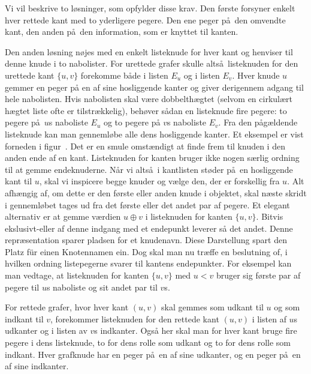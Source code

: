 Vi vil beskrive to løsninger, som opfylder disse krav.
Den første forsyner enkelt hver rettede kant med to yderligere pegere.
Den ene peger på den omvendte kant, den anden på den information, som er knyttet til kanten.

Den anden løsning nøjes med en enkelt listeknude for hver kant og henviser til denne knude i to nabolister.
For urettede grafer skulle altså listeknuden for den urettede kant $\{u,v\}$ forekomme både i listen $E_u$ og i listen $E_v$.
Hver knude $u$ gemmer en peger på en af sine hosliggende kanter og giver derigennem adgang til hele nabolisten.
Hvis nabolisten skal være dobbelthægtet (selvom en cirkulært hægtet liste ofte er tilstrækkelig), behøver sådan en listeknude fire pegere:
to pegere på $u$s naboliste $E_u$ og to pegere på $v$s naboliste $E_v$.
Fra den pågældende listeknude kan man gennemløbe alle dens hosliggende kanter.
Et eksempel er vist forneden i figur~.
Det er en smule omstændigt at finde frem til knuden i den anden ende af en kant.
Listeknuden for kanten bruger ikke nogen særlig ordning til at gemme endeknuderne.
Når vi altså i kantlisten støder på en hosliggende kant til $u$, skal vi inspicere begge knuder og vælge den, der er forskellig fra $u$.
Alt afhængig af, om dette er den første eller anden knude i objektet, skal næste skridt i gennemløbet tages ud fra det første eller det andet par af pegere.
Et elegant alternativ er at gemme værdien $u\oplus v$ i listeknuden for kanten $\{u,v\}$.
\cite{Naeher-Zlotowski}
Bitvis ekslusivt-eller af denne indgang med et endepunkt leverer så det andet.
Denne repræsentation sparer pladsen for et knudenavn.
Diese Darstellung spart den Platz für einen Knotennamen ein. 
Dog skal man nu træffe en beslutning of, i hvilken ordning listepegerne svarer til kantens endepunkter. 
For eksempel kan man vedtage, at listeknuden for kanten $\{u,v\}$ med $u<v$ bruger sig første par af pegere til $u$s naboliste og sit andet par til $v$s.

For rettede grafer, hvor hver kant $(u,v)$ skal gemmes som udkant til $u$ og som indkant til $v$, forekommer listeknuden for den rettede kant $(u,v)$ i listen af $u$s udkanter og i listen av $v$s indkanter.
Også her skal man for hver kant bruge fire pegere i dens listeknude, to for dens rolle som udkant og to for dens rolle som indkant.
Hver grafknude har en peger på en af sine udkanter, og en peger på en af sine indkanter.

